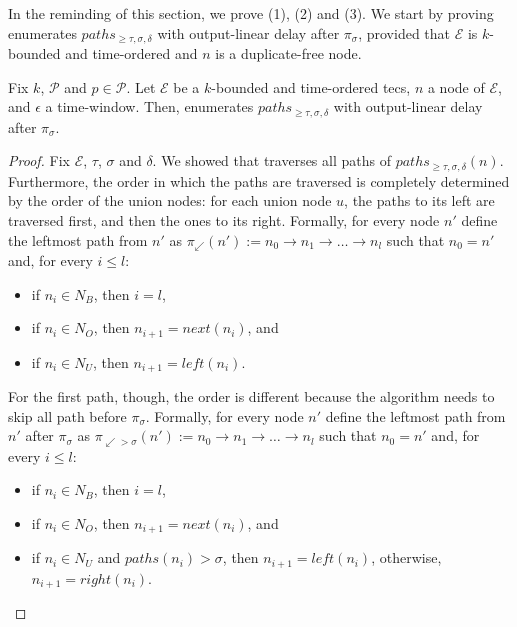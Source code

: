 In the reminding of this section, we prove (1), (2) and (3). We start by proving  enumerates $paths_{\ge \tau, \sigma, \delta}$ with output-linear delay after $\pi_{\sigma}$, provided that $\mathcal{E}$ is $k$-bounded and time-ordered and $n$ is a duplicate-free node.

\begin{lemma}\label{lemma:enumeration:process}
  Fix $k$, $\mathcal{P}$ and $p \in \mathcal{P}$. Let $\mathcal{E}$ be a $k$-bounded and time-ordered \acrshort{tecs}, $n$ a node of $\mathcal{E}$, and $\epsilon$ a time-window. Then,  enumerates $paths_{\ge \tau, \sigma, \delta}$ with output-linear delay after $\pi_{\sigma}$.
\end{lemma}

\begin{proof}
  Fix $\mathcal{E}$, $\tau$, $\sigma$ and $\delta$. We showed that  traverses all paths of $paths_{\ge \tau, \sigma, \delta}(n)$. Furthermore, the order in which the paths are traversed is completely determined by the order of the union nodes: for each union node $u$, the paths to its left are traversed first, and then the ones to its right. Formally, for every node $n'$ define the leftmost path from $n'$ as ${\pi_{\swarrow}(n') := n_{0} \rightarrow n_{1} \rightarrow \ldots \rightarrow n_{l}}$ such that $n_{0} = n'$ and, for every $i \le l$:

  \begin{itemize}
      \item if $n_{i} \in N_{B}$, then $i = l$,
      \item if $n_{i} \in N_{O}$, then $n_{i+1} = next(n_{i})$, and
      \item if $n_{i} \in N_{U}$, then $n_{i+1} = left(n_{i})$.
  \end{itemize}

  For the first path, though, the order is different because the algorithm needs to skip all path before $\pi_{\sigma}$. Formally, for every node $n'$ define the leftmost path from $n'$ after $\pi_{\sigma}$ as ${\pi_{\swarrow > \sigma}(n') := n_{0} \rightarrow n_{1} \rightarrow \ldots \rightarrow n_{l}}$ such that $n_{0} = n'$ and, for every $i \le l$:
  \begin{itemize}
      \item if $n_{i} \in N_{B}$, then $i = l$,
      \item if $n_{i} \in N_{O}$, then $n_{i+1} = next(n_{i})$, and
      \item if $n_{i} \in N_{U}$ and $paths(n_{i}) > \sigma$, then ${n_{i+1} = left(n_{i})}$, otherwise, ${n_{i+1} = right(n_{i})}$.
  \end{itemize}


\end{proof}
